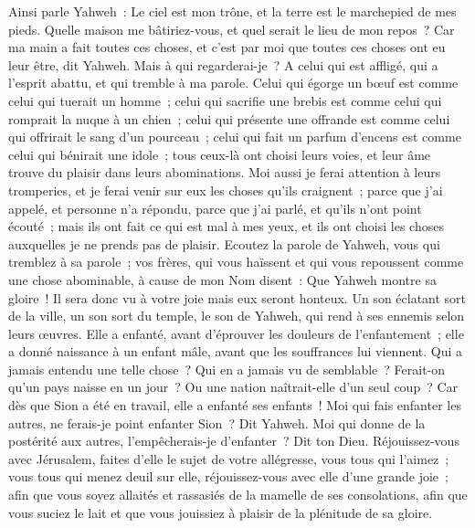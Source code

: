 \begin{multicols}{2}
\VerseOne{}Ainsi parle Yahweh~: Le ciel est mon trône, et la terre est le marchepied de mes pieds. Quelle maison me bâtiriez-vous, et quel serait le lieu de mon repos~?
Car ma main a fait toutes ces choses, et c'est par moi que toutes ces choses ont eu leur être, dit Yahweh. Mais à qui regarderai-je~? A celui qui est affligé, qui a l'esprit abattu, et qui tremble à ma parole.
Celui qui égorge un bœuf est comme celui qui tuerait un homme~; celui qui sacrifie une brebis est comme celui qui romprait la nuque à un chien~; celui qui présente une offrande est comme celui qui offrirait le sang d'un pourceau~; celui qui fait un parfum d'encens est comme celui qui bénirait une idole~; tous ceux-là ont choisi leurs voies, et leur âme trouve du plaisir dans leurs abominations.
Moi aussi je ferai attention à leurs tromperies, et je ferai venir sur eux les choses qu'ils craignent~; parce que j'ai appelé, et personne n'a répondu, parce que j'ai parlé, et qu'ils n'ont point écouté~; mais ils ont fait ce qui est mal à mes yeux, et ils ont choisi les choses auxquelles je ne prends pas de plaisir. 
Ecoutez la parole de Yahweh, vous qui tremblez à sa parole~; vos frères, qui vous haïssent et qui vous repoussent comme une chose abominable, à cause de mon Nom disent~: Que Yahweh montre sa gloire~! Il sera donc vu à votre joie mais eux seront honteux. 
Un son éclatant sort de la ville, un son sort du temple, le son de Yahweh, qui rend à ses ennemis selon leurs œuvres.
Elle a enfanté, avant d'éprouver les douleurs de l'enfantement~; elle a donné naissance à un enfant mâle, avant que les souffrances lui viennent.
Qui a jamais entendu une telle chose~? Qui en a jamais vu de semblable~? Ferait-on qu'un pays naisse en un jour~? Ou une nation naîtrait-elle d'un seul coup~? Car dès que Sion a été en travail, elle a enfanté ses enfants~!
Moi qui fais enfanter les autres, ne ferais-je point enfanter Sion~? Dit Yahweh. Moi qui donne de la postérité aux autres, l'empêcherais-je d'enfanter~? Dit ton Dieu.
Réjouissez-vous avec Jérusalem, faites d'elle le sujet de votre allégresse, vous tous qui l'aimez~; vous tous qui menez deuil sur elle, réjouissez-vous avec elle d'une grande joie~;
afin que vous soyez allaités et rassasiés de la mamelle de ses consolations, afin que vous suciez le lait et que vous jouissiez à plaisir de la plénitude de sa gloire.

\end{multicols}
